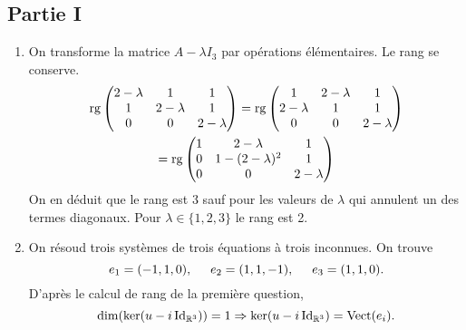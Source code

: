 \subsection*{Partie I}
\begin{enumerate}
 \item On transforme la matrice $A-\lambda I_3$ par opérations élémentaires. Le rang se conserve.
\begin{multline*}
\operatorname{rg} \begin{pmatrix}
2-\lambda & 1 & 1 \\
1 & 2-\lambda & 1 \\
0 & 0 & 2-\lambda
    \end{pmatrix}
= \operatorname{rg}
\begin{pmatrix}
1 & 2-\lambda & 1 \\
2-\lambda & 1 & 1 \\
0 & 0 & 2-\lambda 
\end{pmatrix}
\\
= \operatorname{rg}
\begin{pmatrix}
1 & 2-\lambda & 1 \\
0 & 1-(2-\lambda)^2 & 1 \\
0 & 0 & 2-\lambda 
\end{pmatrix}
\end{multline*}
On en déduit que le rang est 3 sauf pour les valeurs de $\lambda$ qui annulent un des termes diagonaux.
Pour $\lambda\in \{1,2,3\}$ le rang est 2.
\item On résoud trois systèmes de trois équations à trois inconnues. On trouve
\[
 e_1 = (-1,1,0), \hspace{0.5cm}
 e_2 = (1,1,-1), \hspace{0.5cm}
 e_3 = (1,1,0).
\]
D'après le calcul de rang de la première question,
\[
\dim(\ker(u-i \operatorname{Id}_{\mathbb{R}^3})) = 1 \Rightarrow \ker(u-i \operatorname{Id}_{\mathbb{R}^3})=\operatorname{Vect} (e_i).
\]


\end{enumerate}
